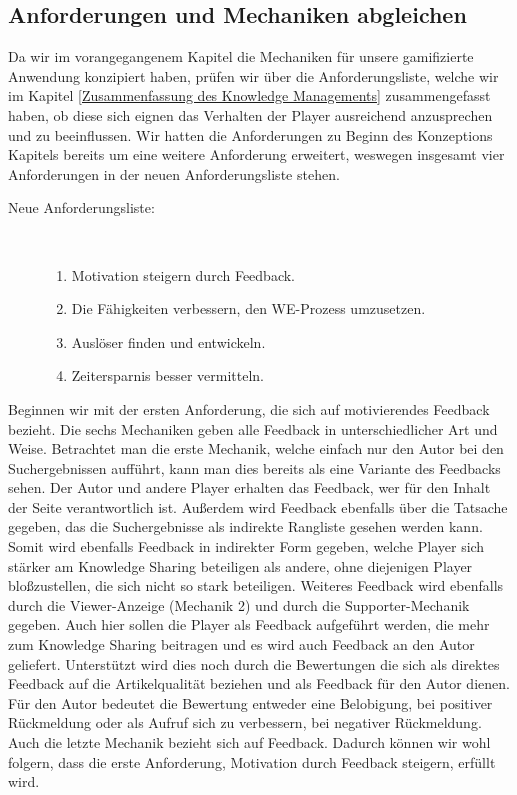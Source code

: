 \documentclass[a4paper,12pt,twoside]{scrartcl}
\begin{document}
\subsection{Anforderungen und Mechaniken abgleichen}
Da wir im vorangegangenem Kapitel die Mechaniken für unsere gamifizierte Anwendung konzipiert haben, prüfen wir über die Anforderungsliste, welche wir im Kapitel \ref{Zusammenfassung des Knowledge Managements} zusammengefasst haben, ob diese sich eignen das Verhalten der Player ausreichend anzusprechen und zu beeinflussen. Wir hatten die Anforderungen zu Beginn des Konzeptions Kapitels bereits um eine weitere Anforderung erweitert, weswegen insgesamt vier Anforderungen in der neuen Anforderungsliste stehen. 
\begin{description}
   \item[Neue Anforderungsliste:]~\par
   \begin{enumerate}
      \item Motivation steigern durch Feedback.
      \item Die Fähigkeiten verbessern, den WE-Prozess umzusetzen.
      \item Auslöser finden und entwickeln.
      \item Zeitersparnis besser vermitteln.
   \end{enumerate}
\end{description}
Beginnen wir mit der ersten Anforderung, die sich auf motivierendes Feedback bezieht. Die sechs Mechaniken geben alle Feedback in unterschiedlicher Art und Weise. Betrachtet man die erste Mechanik, welche einfach nur den Autor bei den Suchergebnissen aufführt, kann man dies bereits als eine Variante des Feedbacks sehen. Der Autor und andere Player erhalten das Feedback, wer für den Inhalt der Seite verantwortlich ist. Außerdem wird Feedback ebenfalls über die Tatsache gegeben, das die Suchergebnisse als indirekte Rangliste gesehen werden kann. Somit wird ebenfalls Feedback in indirekter Form gegeben, welche Player sich stärker am Knowledge Sharing beteiligen als andere, ohne diejenigen Player bloßzustellen, die sich nicht so stark beteiligen. Weiteres Feedback wird ebenfalls durch die Viewer-Anzeige (Mechanik 2) und durch die Supporter-Mechanik gegeben. Auch hier sollen die Player als Feedback aufgeführt werden, die mehr zum Knowledge Sharing beitragen und es wird auch Feedback an den Autor geliefert. Unterstützt wird dies noch durch die Bewertungen die sich als direktes Feedback auf die Artikelqualität beziehen und als Feedback für den Autor dienen. Für den Autor bedeutet die Bewertung entweder eine Belobigung, bei positiver Rückmeldung oder als Aufruf sich zu verbessern, bei negativer Rückmeldung. Auch die letzte Mechanik bezieht sich auf Feedback. Dadurch können wir wohl folgern, dass die erste Anforderung, Motivation durch Feedback steigern, erfüllt wird.
\end{document}
